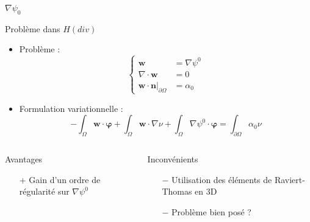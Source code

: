 \documentclass{beamer}
\newcommand{\grad}{{\nabla}}
\renewcommand{\div}{{\nabla\cdot}}
\newcommand{\restr}{{\big\rvert_{\partial\Omega}}}
\begin{document}
\begin{frame}{$\grad\psi_0$}
\begin{block}{Problème dans $ H(div)$}
\begin{itemize}
\item Problème :
\[\left\{
\begin{aligned}
\mathbf{w} &= \grad \psi^0\\
\div\mathbf{w} &= 0\\
\mathbf{w}\cdot \mathbf{n}\restr &= \alpha_0
\end{aligned}
\right.\]
\item Formulation variationnelle :
\[
-\int_\Omega \mathbf{w}\cdot\bm{\varphi} + \int_\Omega \mathbf{w}\cdot\grad\nu + \int_\Omega \grad\psi^0\cdot\bm{\varphi}  = \int_{\partial\Omega} \alpha_0\nu
\]
\end{itemize}
\end{block}
\begin{columns}[t]
\begin{column}{5cm}
\begin{exampleblock}{Avantages}
\begin{itemize}
\item[+] Gain d'un ordre de régularité sur $\grad\psi^0$
\end{itemize}
\end{exampleblock}
\end{column}
\begin{column}{5cm}
\begin{alertblock}{Inconvénients}
\begin{itemize}
\item[$-$] Utilisation des éléments de Raviert-Thomas en 3D
\item[$-$] Problème bien posé ?
\end{itemize}
\end{alertblock}
\end{column}
\end{columns}
\end{frame}
\end{document}
